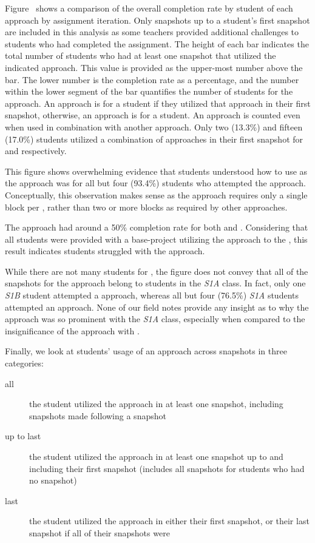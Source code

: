 Figure~ shows a comparison of the
overall completion rate by student of each approach by assignment
iteration. Only snapshots up to a student's first \com{} snapshot are included
in this analysis as some teachers provided additional challenges to students
who had completed the assignment. The height of each bar indicates the total
number of students who had at least one snapshot that utilized the indicated
approach. This value is provided as the upper-most number above the bar. The
lower number is the completion rate as a percentage, and the number within the
lower segment of the bar quantifies the number of \com{} students for the
approach. An approach is \com{} for a student if they utilized that approach in
their first \com{} snapshot, otherwise, an approach is \incom{} for a
student. An approach is counted even when used in combination with another
approach. Only two (13.3\%) and fifteen (17.0\%) \com{} students utilized a
combination of approaches in their first \com{} snapshot for \sone{} and
\stwo{} respectively.

This figure shows overwhelming evidence that students understood how to use
\glideto{} as the approach was \com{} for all but four (93.4\%) students who
attempted the approach. Conceptually, this observation makes sense as the
approach requires only a single block per \catch{}, rather than two or more
blocks as required by other approaches.

The \abs{} approach had around a 50\% completion rate for both \sone{} and
\stwo{}. Considering that all students were provided with a base-project
utilizing the \abs{} approach to \catch{} the \zebra{}, this result indicates
students struggled with the \abs{} approach.

While there are not many students for \sone{}, the figure does not convey that
all of the \com{} snapshots for the \rel{} approach belong to students in the
\emph{S1A} class. In fact, only one \emph{S1B} student attempted a \rel{}
approach, whereas all but four (76.5\%) \emph{S1A} students attempted an \abs{}
approach. None of our field notes provide any insight as to why the \rel{}
approach was so prominent with the \emph{S1A} class, especially when compared
to the insignificance of the \rel{} approach with \stwo{}.

Finally, we look at students' usage of an approach across snapshots in three
categories:

\begin{description}
\item[all] the student utilized the approach in at least one snapshot,
  including snapshots made following a \com{} snapshot
\item[up to last] the student utilized the approach in at least one snapshot up
  to and including their first \com{} snapshot (includes all snapshots for
  students who had no \com{} snapshot)
\item[last] the student utilized the approach in either their first \com{}
  snapshot, or their last snapshot if all of their snapshots were \incom{}
\end{description}

